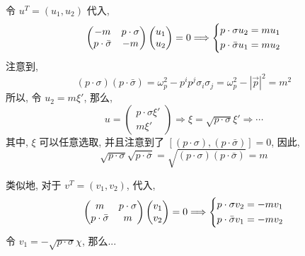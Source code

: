 \begin{itemize}
	\begin{tcolorbox}[title=proof:]
		令 $u^T = (u_1, u_2)$ 代入,
		\begin{equation}
			\begin{pmatrix}
				- m & p \cdot \sigma \\
				p \cdot \bar{\sigma} & - m
			\end{pmatrix} \begin{pmatrix}
				u_1 \\
				u_2
			\end{pmatrix} = 0 \Longrightarrow \begin{dcases}
				p \cdot \sigma u_2 = m u_1 \\
				p \cdot \bar{\sigma} u_1 = m u_2
			\end{dcases}
		\end{equation}
		注意到,
		\begin{equation}
			(p \cdot \sigma) (p \cdot \bar{\sigma}) = \omega_p^2 - p^i p^j \sigma_i \sigma_j = \omega_p^2 - |\vec{p}|^2 = m^2
		\end{equation}
		所以, 令 $u_2 = m \xi'$, 那么,
		\begin{equation}
			u = \begin{pmatrix}
				p \cdot \sigma \xi' \\
				m \xi'
			\end{pmatrix} \Longrightarrow \xi = \sqrt{p \cdot \sigma} \xi' \Longrightarrow \cdots
		\end{equation}
		其中, $\xi$ 可以任意选取, 并且注意到了 $[(p \cdot \sigma), (p \cdot \bar{\sigma})] = 0$, 因此,
		\begin{equation}
			\sqrt{p \cdot \sigma} \sqrt{p \cdot \bar{\sigma}} = \sqrt{(p \cdot \sigma) (p \cdot \bar{\sigma})} = m
		\end{equation}
		
		\noindent\hdashrule[0.5ex]{\linewidth}{0.5pt}{1mm} %
		
		类似地, 对于 $v^T = (v_1, v_2)$, 代入,
		\begin{equation}
			\begin{pmatrix}
				m & p \cdot \sigma \\
				p \cdot \bar{\sigma} & m
			\end{pmatrix} \begin{pmatrix}
				v_1 \\
				v_2
			\end{pmatrix} = 0 \Longrightarrow \begin{dcases}
				p \cdot \sigma v_2 = - m v_1 \\
				p \cdot \bar{\sigma} v_1 = - m v_2
			\end{dcases}
		\end{equation}
		令 $v_1 = - \sqrt{p \cdot \sigma} \chi$, 那么...
		

\end{tcolorbox}
\end{itemize}
